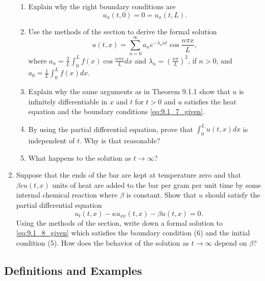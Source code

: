 \documentclass{article}
\begin{document}
\begin{enumerate}
\begin{enumerate}
              \item Explain why the right boundary conditions are
                    \begin{equation}
                        u_x(t,0) = 0 = u_x(t,L).
                        \label{eq:9.1_7_given}
                    \end{equation}
              \item Use the methods of the section to derive the formal solution
                    \[
                        u(t,x)=\sum_{n=0}^\infty a_ne^{-\lambda_n\kappa t}\cos\frac{n\pi x}{L},
                    \]
                    where $a_n=\frac{2}{L}\int_0^L f(x)\cos\frac{n\pi x}{L}dx$ and
                    $\lambda_n=(\frac{n\pi}{L})^2$, if $n>0$, and
                    $a_0=\frac{1}{L}\int_0^L f(x)dx$.
              \item Explain why the same arguments as in Theorem 9.1.1 show that $u$
                    is infinitely differentiable in $x$ and $t$ for $t>0$ and $u$ satisfies
                    the heat equation and the boundary conditions \eqref{eq:9.1_7_given}.
              \item By using the partial differential equation, prove that
                    $\int_0^Lu(t,x)dx$ is independent of $t$. Why is that reasonable?
              \item What happens to the solution as $t\to\infty$?
          \end{enumerate}
    \item Suppose that the ends of the bar are kept at temperature zero and that
          $\beta cu(t,x)$ units of heat are added to the bar per gram per unit time
          by some internal chemical reaction where $\beta$ is constant. Show that $u$
          should satisfy the partial differential equation
          \begin{equation}
              u_t(t,x)-\kappa u_{xx}(t,x)-\beta u(t,x) = 0.
              \label{eq:9.1_8_given}
          \end{equation}
          Using the methods of the section, write down a formal solution to
          \eqref{eq:9.1_8_given} which satisfies the boundary condition (6) and the
          initial condition (5). How does the behavior of the solution as $t\to\infty$
          depend on $\beta$?
\end{enumerate}

\subsection{Definitions and Examples}
\end{document}
